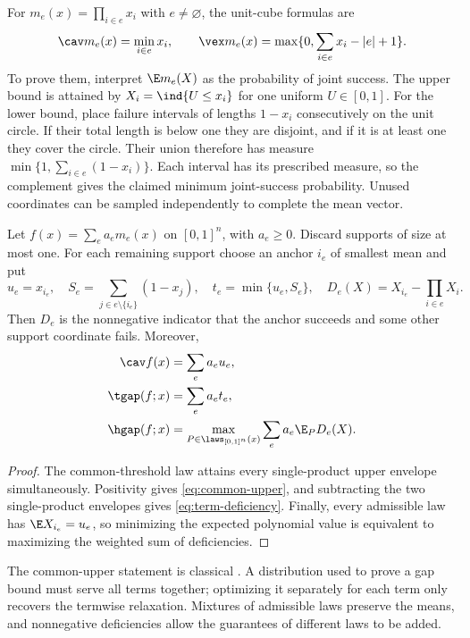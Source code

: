 For $m_e(x)=\prod_{i\in e}x_i$ with $e\ne\varnothing$, the unit-cube
formulas are
\begin{equation}\label{eq:monomial-envelopes}
 \cav m_e(x)=\min_{i\in e}x_i,\qquad
 \vex m_e(x)=\max\{0,\sum_{i\in e}x_i-|e|+1\}.
\end{equation}
To prove them, interpret $\E m_e(X)$ as the probability of joint success.
The upper bound is attained by $X_i=\ind\{U\le x_i\}$ for one uniform
$U\in[0,1]$. For the lower bound, place failure intervals of lengths
$1-x_i$ consecutively on the unit circle. If their total length is below
one they are disjoint, and if it is at least one they cover the circle.
Their union therefore has measure $\min\{1,\sum_{i\in e}(1-x_i)\}$.
Each interval has its prescribed measure, so the complement gives the
claimed minimum joint-success probability. Unused coordinates can be
sampled independently to complete the mean vector.

\begin{proposition}
\label{prop:deficiency}
Let $f(x)=\sum_e a_e m_e(x)$ on $[0,1]^n$, with $a_e\ge0$. Discard
supports of size at most one. For each remaining support choose an anchor
$i_e$ of smallest mean and put
\[
 u_e=x_{i_e},\quad S_e=\sum_{j\in e\setminus\{i_e\}}(1-x_j),
 \quad t_e=\min\{u_e,S_e\},\quad
 D_e(X)=X_{i_e}-\prod_{i\in e}X_i.
\]
Then $D_e$ is the nonnegative indicator that the anchor succeeds and some
other support coordinate fails. Moreover,
\begin{align}
 \cav f(x)&=\sum_e a_eu_e,\label{eq:common-upper}\\
 \tgap(f;x)&=\sum_e a_et_e,\label{eq:term-deficiency}\\
 \hgap(f;x)&=\max_{P\in\laws_{[0,1]^n}(x)}
                     \sum_e a_e\E_P D_e(X).\label{eq:hull-deficiency}
\end{align}
\end{proposition}
\begin{proof}
The common-threshold law attains every single-product upper envelope
simultaneously. Positivity gives \eqref{eq:common-upper}, and subtracting
the two single-product envelopes gives \eqref{eq:term-deficiency}.
Finally, every admissible law has $\E X_{i_e}=u_e$, so minimizing the
expected polynomial value is equivalent to maximizing the weighted
sum of deficiencies.
\end{proof}

The common-upper statement is classical
\citep[Theorems 4--5 in the authors' manuscript]{Luedtke2012}. A
distribution used to prove a gap bound must serve all terms together;
optimizing it separately for each term only recovers the termwise
relaxation. Mixtures of admissible laws preserve the means, and nonnegative
deficiencies allow the guarantees of different laws to be added.


